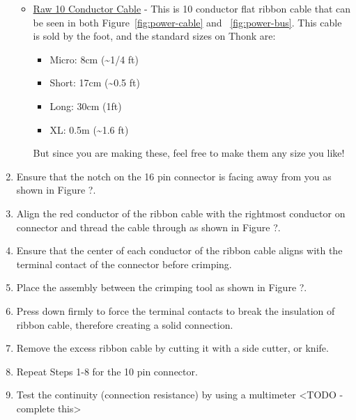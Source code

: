 \documentclass{article}
\begin{document}
\begin{enumerate}
\begin{itemize}
		\item \href{https://www.taydaelectronics.com/awg-28-10-conductor-flat-ribbon-cable-1ft-30cm.html}{Raw 10 Conductor Cable} - This is 10 conductor flat ribbon cable that can be seen in both Figure~\ref{fig:power-cable} and ~\ref{fig:power-bus}. This cable is sold by the foot, and the standard sizes on Thonk are:\\
		\begin{itemize}
			\item Micro: 8cm (\textasciitilde1/4 ft)
			\item Short: 17cm (\textasciitilde0.5 ft)
			\item Long: 30cm (1ft)
			\item XL: 0.5m (\textasciitilde1.6 ft)
		\end{itemize}
	\vspace{0.3cm}
	But since you are making these, feel free to make them any size you like!
    \end{itemize}
\item Ensure that the notch on the 16 pin connector is facing away from you as shown in Figure ?.
\item Align the red conductor of the ribbon cable with the rightmost conductor on connector and thread the cable through as shown in Figure ?.
\item Ensure that the center of each conductor of the ribbon cable aligns with the terminal contact of the connector before crimping.
\item Place the assembly between the crimping tool as shown in Figure ?.
\item Press down firmly to force the terminal contacts to break the insulation of ribbon cable, therefore creating a solid connection.
\item Remove the excess ribbon cable by cutting it with a side cutter, or knife.
\item Repeat Steps 1-8 for the 10 pin connector.
\item Test the continuity (connection resistance) by using a multimeter <TODO - complete this>
\end{enumerate}
\end{document}
